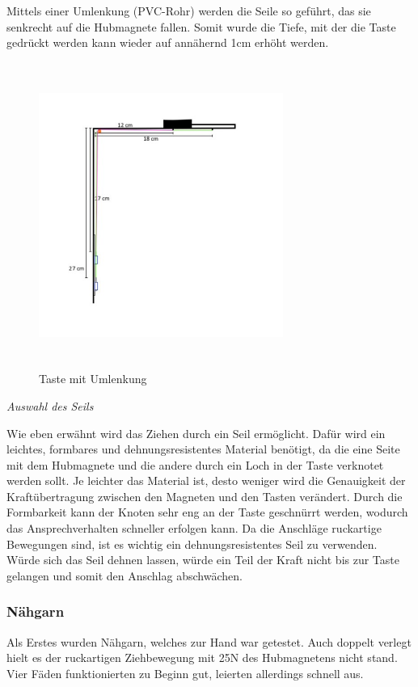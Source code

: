 Mittels einer Umlenkung (PVC-Rohr) werden die Seile so geführt, das sie senkrecht auf die Hubmagnete fallen.
Somit wurde die Tiefe, mit der die Taste gedrückt werden kann wieder auf annähernd 1cm erhöht werden.

\begin{figure}[htbp]
	\centering
	\includegraphics [width=8cm, height=10cm] {img/mitUmlenkung_locker}
	\caption{Taste mit Umlenkung}
	\label{<label>}
\end{figure}


\textit{Auswahl des Seils}

Wie eben erwähnt wird das Ziehen durch ein Seil ermöglicht.
Dafür wird ein leichtes, formbares und dehnungsresistentes Material benötigt, da die eine Seite mit dem Hubmagnete und die andere durch ein Loch in der Taste verknotet werden sollt.
Je leichter das Material ist, desto weniger wird die Genauigkeit der Kraftübertragung zwischen den Magneten und den Tasten verändert.
Durch die Formbarkeit kann der Knoten sehr eng an der Taste geschnürrt werden, wodurch das Ansprechverhalten schneller erfolgen kann.
Da die Anschläge ruckartige Bewegungen sind, ist es wichtig ein dehnungsresistentes Seil zu verwenden.
Würde sich das Seil dehnen lassen, würde ein Teil der Kraft nicht bis zur Taste gelangen und somit den Anschlag abschwächen.

\subsubsection{Nähgarn}

Als Erstes wurden Nähgarn, welches zur Hand war getestet.
Auch doppelt verlegt hielt es der ruckartigen Ziehbewegung mit 25N des Hubmagnetens nicht stand.
Vier Fäden funktionierten zu Beginn gut, leierten allerdings schnell aus.

